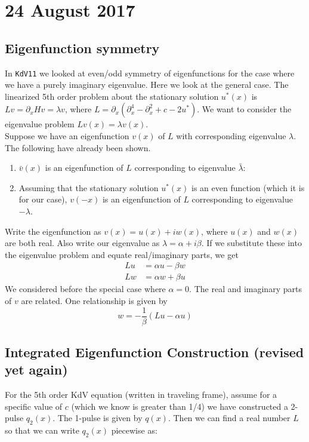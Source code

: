 \documentclass[12pt]{article}
\begin{document}
\section*{24 August 2017}

\subsection*{Eigenfunction symmetry}

In \texttt{KdV11} we looked at even/odd symmetry of eigenfunctions for the case where we have a purely imaginary eigenvalue. Here we look at the general case. The linearized 5th order problem about the stationary solution $u^*(x)$ is $Lv = \partial_x Hv = \lambda v$, where $L = \partial_x( \partial_x^4 - \partial_x^2 + c - 2u^*)$. We want to consider the eigenvalue problem $Lv(x) = \lambda v(x)$. \\

Suppose we have an eigenfunction $v(x)$ of $L$ with corresponding eigenvalue $\lambda$. The following have already been shown.
\begin{enumerate}
	\item $\bar{v}(x)$ is an eigenfunction of $L$ corresponding to eigenvalue $\bar{\lambda}$:
	\item Assuming that the stationary solution $u^*(x)$ is an even function (which it is for our case), $v(-x)$ is an eigenfunction of $L$ corresponding to eigenvalue $-\lambda$.
\end{enumerate}
Write the eigenfunction as $v(x) = u(x) + i w(x)$, where $u(x)$ and $w(x)$ are both real. Also write our eigenvalue as $\lambda = \alpha + i \beta$. If we substitute these into the eigenvalue problem and equate real/imaginary parts, we get
\begin{align*}
Lu &= \alpha u - \beta w \\
Lw &= \alpha w + \beta u
\end{align*}
We considered before the special case where $\alpha = 0$. The real and imaginary parts of $v$ are related. One relationship is given by
\[
w = -\frac{1}{\beta}(Lu - \alpha u)
\]


\subsection*{Integrated Eigenfunction Construction (revised yet again)}
For the 5th order KdV equation (written in traveling frame), assume for a specific value of $c$ (which we know is greater than 1/4) we have constructed a 2-pulse $q_2(x)$. The 1-pulse is given by $q(x)$. Then we can find a real number $L$ so that we can write $q_2(x)$ piecewise as:
\end{document}
